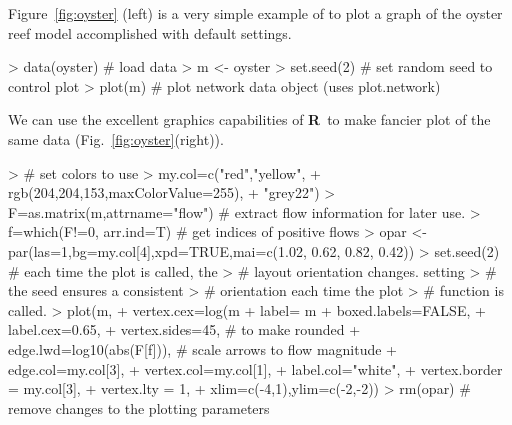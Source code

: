 \documentclass[article]{jss}
\newcommand{\R}{\textbf{R}}
\begin{document}
Figure~\ref{fig:oyster} (left) is a very simple example of to plot a
graph of the oyster reef model accomplished with default settings.


\begin{Schunk}
\begin{Sinput}
> data(oyster)  # load data
> m <- oyster
> set.seed(2)    # set random seed to control plot
> plot(m)       # plot network data object (uses plot.network)
\end{Sinput}
\end{Schunk}

We can use the excellent graphics capabilities of \R\ to make fancier
plot of the same data (Fig.~\ref{fig:oyster}(right)).


\begin{Schunk}
\begin{Sinput}
> # set colors to use
> my.col=c("red","yellow",
+    rgb(204,204,153,maxColorValue=255),
+    "grey22")
> F=as.matrix(m,attrname="flow")                   # extract flow information for later use.
> f=which(F!=0, arr.ind=T)       # get indices of positive flows
> opar <- par(las=1,bg=my.col[4],xpd=TRUE,mai=c(1.02, 0.62, 0.82, 0.42))
> set.seed(2)                    # each time the plot is called, the
>                                # layout orientation changes.  setting
>                                # the seed ensures a consistent
>                                # orientation each time the plot
>                                # function is called.
> plot(m,
+       vertex.cex=log(m%
+       label= m%
+       boxed.labels=FALSE,
+       label.cex=0.65,
+       vertex.sides=45,   # to make rounded
+       edge.lwd=log10(abs(F[f])),     # scale arrows to flow magnitude
+       edge.col=my.col[3],
+       vertex.col=my.col[1],
+       label.col="white",
+       vertex.border = my.col[3],
+       vertex.lty = 1,
+       xlim=c(-4,1),ylim=c(-2,-2))
> rm(opar)             # remove changes to the plotting parameters
\end{Sinput}
\end{Schunk}
\end{document}
